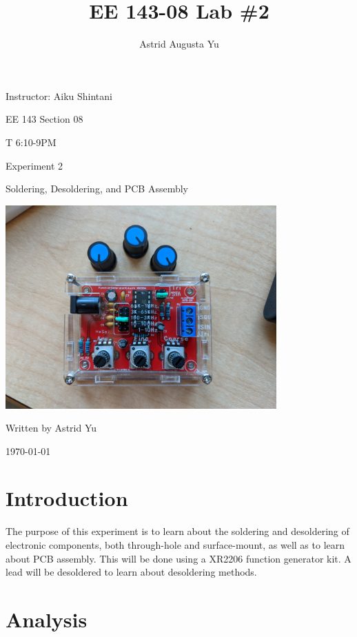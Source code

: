 \documentclass[12pt]{article}
\author{Astrid Augusta Yu}
\title{EE 143-08 Lab \#2}
\begin{document}
\begin{titlepage}
    \centering
    {
    \Large
    Instructor: Aiku Shintani 
    \vspace{.25cm}
    
    EE 143 Section 08 \par \vspace{.2cm}\par
    T 6:10-9PM    
    }
    
    \vfill
    
    {
    \Huge
    Experiment 2 \par
    Soldering, Desoldering, and PCB Assembly
    }
    
    \vfill
    
    \includegraphics[width=0.78\textwidth]{front.jpg}\par\vspace{1cm}
    \vfill
    
    {\large 
    Written by Astrid Yu\par
    \today}
\end{titlepage}

\section*{Introduction}

The purpose of this experiment is to learn about the soldering and desoldering of electronic components,
both through-hole and surface-mount, as well as to learn about PCB assembly. This will be done using a 
XR2206 function generator kit. A lead will be desoldered to learn about desoldering methods.

\section*{Analysis}
\end{document}
